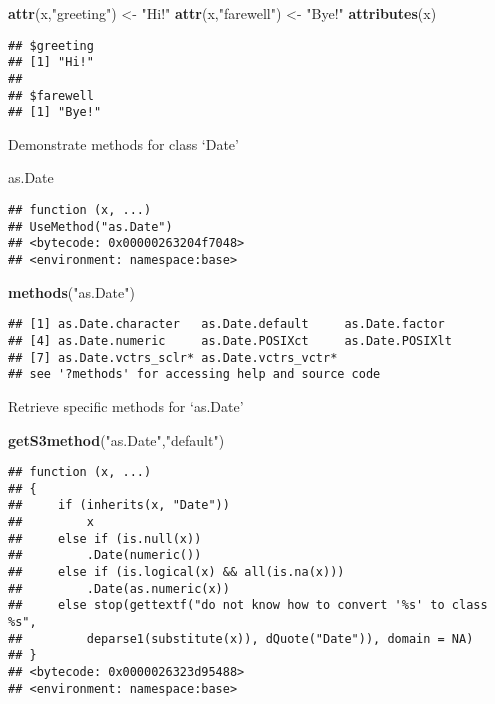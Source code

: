 \documentclass[
]{article}
\newenvironment{Shaded}{\begin{snugshade}}{\end{snugshade}}
\newcommand{\FunctionTok}[1]{\textcolor[rgb]{0.13,0.29,0.53}{\textbf{#1}}}
\newcommand{\NormalTok}[1]{#1}
\newcommand{\OtherTok}[1]{\textcolor[rgb]{0.56,0.35,0.01}{#1}}
\newcommand{\StringTok}[1]{\textcolor[rgb]{0.31,0.60,0.02}{#1}}
\begin{document}
\begin{Shaded}
\begin{Highlighting}[]
\FunctionTok{attr}\NormalTok{(x,}\StringTok{"greeting"}\NormalTok{) }\OtherTok{\textless{}{-}} \StringTok{"Hi!"}
\FunctionTok{attr}\NormalTok{(x,}\StringTok{"farewell"}\NormalTok{) }\OtherTok{\textless{}{-}} \StringTok{"Bye!"}
\FunctionTok{attributes}\NormalTok{(x)}
\end{Highlighting}
\end{Shaded}

\begin{verbatim}
## $greeting
## [1] "Hi!"
## 
## $farewell
## [1] "Bye!"
\end{verbatim}

Demonstrate methods for class `Date'

\begin{Shaded}
\begin{Highlighting}[]
\NormalTok{as.Date}
\end{Highlighting}
\end{Shaded}

\begin{verbatim}
## function (x, ...) 
## UseMethod("as.Date")
## <bytecode: 0x00000263204f7048>
## <environment: namespace:base>
\end{verbatim}

\begin{Shaded}
\begin{Highlighting}[]
\FunctionTok{methods}\NormalTok{(}\StringTok{"as.Date"}\NormalTok{)}
\end{Highlighting}
\end{Shaded}

\begin{verbatim}
## [1] as.Date.character   as.Date.default     as.Date.factor     
## [4] as.Date.numeric     as.Date.POSIXct     as.Date.POSIXlt    
## [7] as.Date.vctrs_sclr* as.Date.vctrs_vctr*
## see '?methods' for accessing help and source code
\end{verbatim}

Retrieve specific methods for `as.Date'

\begin{Shaded}
\begin{Highlighting}[]
\FunctionTok{getS3method}\NormalTok{(}\StringTok{"as.Date"}\NormalTok{,}\StringTok{"default"}\NormalTok{)}
\end{Highlighting}
\end{Shaded}

\begin{verbatim}
## function (x, ...) 
## {
##     if (inherits(x, "Date")) 
##         x
##     else if (is.null(x)) 
##         .Date(numeric())
##     else if (is.logical(x) && all(is.na(x))) 
##         .Date(as.numeric(x))
##     else stop(gettextf("do not know how to convert '%s' to class %s", 
##         deparse1(substitute(x)), dQuote("Date")), domain = NA)
## }
## <bytecode: 0x0000026323d95488>
## <environment: namespace:base>
\end{verbatim}
\end{document}
